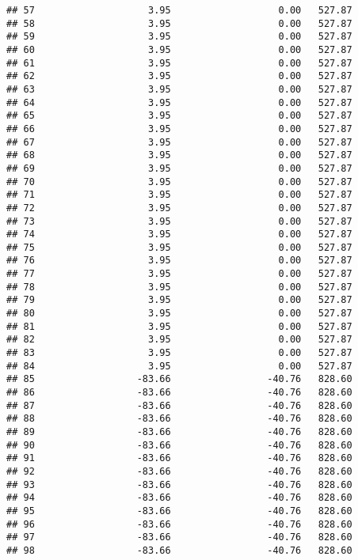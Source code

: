 \documentclass[]{article}
\begin{document}
\begin{verbatim}
## 57                    3.95                   0.00   527.87
## 58                    3.95                   0.00   527.87
## 59                    3.95                   0.00   527.87
## 60                    3.95                   0.00   527.87
## 61                    3.95                   0.00   527.87
## 62                    3.95                   0.00   527.87
## 63                    3.95                   0.00   527.87
## 64                    3.95                   0.00   527.87
## 65                    3.95                   0.00   527.87
## 66                    3.95                   0.00   527.87
## 67                    3.95                   0.00   527.87
## 68                    3.95                   0.00   527.87
## 69                    3.95                   0.00   527.87
## 70                    3.95                   0.00   527.87
## 71                    3.95                   0.00   527.87
## 72                    3.95                   0.00   527.87
## 73                    3.95                   0.00   527.87
## 74                    3.95                   0.00   527.87
## 75                    3.95                   0.00   527.87
## 76                    3.95                   0.00   527.87
## 77                    3.95                   0.00   527.87
## 78                    3.95                   0.00   527.87
## 79                    3.95                   0.00   527.87
## 80                    3.95                   0.00   527.87
## 81                    3.95                   0.00   527.87
## 82                    3.95                   0.00   527.87
## 83                    3.95                   0.00   527.87
## 84                    3.95                   0.00   527.87
## 85                  -83.66                 -40.76   828.60
## 86                  -83.66                 -40.76   828.60
## 87                  -83.66                 -40.76   828.60
## 88                  -83.66                 -40.76   828.60
## 89                  -83.66                 -40.76   828.60
## 90                  -83.66                 -40.76   828.60
## 91                  -83.66                 -40.76   828.60
## 92                  -83.66                 -40.76   828.60
## 93                  -83.66                 -40.76   828.60
## 94                  -83.66                 -40.76   828.60
## 95                  -83.66                 -40.76   828.60
## 96                  -83.66                 -40.76   828.60
## 97                  -83.66                 -40.76   828.60
## 98                  -83.66                 -40.76   828.60

\end{verbatim}
\end{document}
